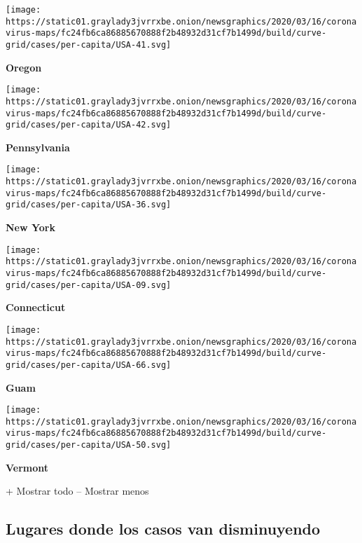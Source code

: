 \texttt{[image: https://static01.graylady3jvrrxbe.onion/newsgraphics/2020/03/16/coronavirus-maps/fc24fb6ca86885670888f2b48932d31cf7b1499d/build/curve-grid/cases/per-capita/USA-41.svg]}

\textbf{Oregon}

\href{https://www.nytimes3xbfgragh.onion/interactive/2020/us/pennsylvania-coronavirus-cases.html}{}

\texttt{[image: https://static01.graylady3jvrrxbe.onion/newsgraphics/2020/03/16/coronavirus-maps/fc24fb6ca86885670888f2b48932d31cf7b1499d/build/curve-grid/cases/per-capita/USA-42.svg]}

\textbf{Pennsylvania}

\href{https://www.nytimes3xbfgragh.onion/interactive/2020/us/new-york-coronavirus-cases.html}{}

\texttt{[image: https://static01.graylady3jvrrxbe.onion/newsgraphics/2020/03/16/coronavirus-maps/fc24fb6ca86885670888f2b48932d31cf7b1499d/build/curve-grid/cases/per-capita/USA-36.svg]}

\textbf{New York}

\href{https://www.nytimes3xbfgragh.onion/interactive/2020/us/connecticut-coronavirus-cases.html}{}

\texttt{[image: https://static01.graylady3jvrrxbe.onion/newsgraphics/2020/03/16/coronavirus-maps/fc24fb6ca86885670888f2b48932d31cf7b1499d/build/curve-grid/cases/per-capita/USA-09.svg]}

\textbf{Connecticut}

\texttt{[image: https://static01.graylady3jvrrxbe.onion/newsgraphics/2020/03/16/coronavirus-maps/fc24fb6ca86885670888f2b48932d31cf7b1499d/build/curve-grid/cases/per-capita/USA-66.svg]}

\textbf{Guam}

\href{https://www.nytimes3xbfgragh.onion/interactive/2020/us/vermont-coronavirus-cases.html}{}

\texttt{[image: https://static01.graylady3jvrrxbe.onion/newsgraphics/2020/03/16/coronavirus-maps/fc24fb6ca86885670888f2b48932d31cf7b1499d/build/curve-grid/cases/per-capita/USA-50.svg]}

\textbf{Vermont}

+ Mostrar todo -- Mostrar menos

\hypertarget{lugares-donde-los-casos-van-disminuyendo}{%
\subsection{Lugares donde los casos van
disminuyendo}\label{lugares-donde-los-casos-van-disminuyendo}}


